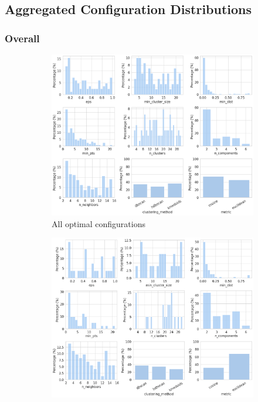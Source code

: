 \documentclass[10pt,oneside]{report}
\begin{document}
\subsection{Aggregated Configuration Distributions}\label{sec:agg_config_dist}
\clearpage
\subsubsection{Overall}
\begin{figure}[H]
    \centering
    \begin{subfigure}[b]{0.82\textwidth}
        \centering
        \includegraphics[width=\textwidth]{./images/overall_param_plot.png}
        \caption{All optimal configurations}
        \label{fig:overall_param_plot} 
    \end{subfigure}
    \begin{subfigure}[b]{0.82\textwidth}
        \centering
        \includegraphics[width=\textwidth]{./images/overall_param_plot_top5.png}

\end{subfigure}
\end{figure}
\end{document}
